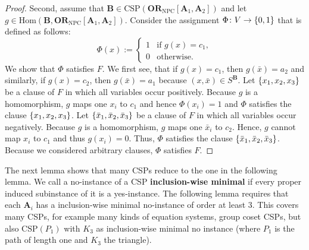 \documentclass[a4paper,english, thm-restate]{lipics-v2021}
\newcommand{\defining}[1]{\textbf{#1}}
\DeclarePairedDelimiter\set{\lbrace}{\rbrace}
\newcommand{\StructA}{\mathbf{A}}
\newcommand{\StructB}{\mathbf{B}}
\newcommand{\CSP}[1]{\mathrm{CSP}(#1)}
\newcommand{\Hom}[2]{\mathrm{Hom}(#1,#2)}
\newcommand{\ORNPC}[1]{\mathbf{OR}_\text{NPC}[#1]}
\begin{document}
\begin{proof}
		Second, assume that $\StructB \in \CSP{\ORNPC{\StructA_1,\StructA_2}}$
		and let $g \in \Hom{\StructB}{\ORNPC{\StructA_1,\StructA_2}}$.
		Consider the assignment $\Phi \colon V \to \set{0,1}$ that is defined as follows:
		\[\Phi(x) := \begin{cases}
			1 & \text{if } g(x) = c_1,\\
			0 & \text{otherwise.}
		\end{cases}\]
		We show that $\Phi$ satisfies $F$.
		We first see, that if $g(x) = c_1$, then $g(\bar{x})=a_2$ and similarly, if
		$g(x) = c_2$, then $g(\bar{x})=a_1$
		because $(x,\bar{x})\in S^\StructB$.
		Let $\set{x_1,x_2,x_3}$ be a clause of $F$
		in which all variables occur positively.
		Because $g$ is a homomorphism, $g$ maps one $x_i$ to $c_1$
		and hence $\Phi(x_i)=1$ and $\Phi$ satisfies the clause $\set{x_1,x_2,x_3}$.
		Let $\set{\bar{x}_1,\bar{x}_2,\bar{x}_3}$ be a clause of $F$
		in which all variables occur negatively.
		Because $g$ is a homomorphism, $g$ maps one $\bar{x}_i$ to $c_2$.
		Hence, $g$ cannot map $x_i$ to $c_1$ and thus $g(x_i) = 0$.
		Thus, $\Phi$ satisfies the clause $\set{\bar{x}_1,\bar{x}_2,\bar{x}_3}$.
		Because we considered arbitrary clauses, $\Phi$ satisfies $F$.
	\end{proof}
	
	The next lemma shows that many CSPs reduce to the one in the following lemma.
	We call a no-instance of a CSP \defining{inclusion-wise minimal}
	if every proper induced subinstance of it is a yes-instance.
	The following lemma requires that each $\StructA_i$
	has a inclusion-wise minimal no-instance of order at least $3$.
	This covers many CSPs, for example many kinds of equation systems,
	group coset CSPs, but also $\CSP{P_1}$ with $K_3$ as inclusion-wise minimal no instance (where $P_1$ is the path of length one and $K_3$ the triangle).
	
\end{document}
